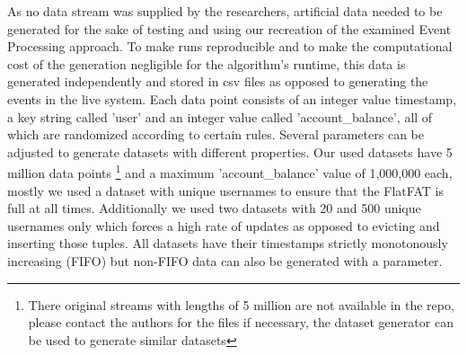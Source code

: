As no data stream was supplied by the researchers, artificial data needed to be generated
for the sake of testing and using our recreation of the examined Event Processing approach.
To make runs reproducible and to make the computational cost of the generation negligible
for the algorithm's runtime, this data is generated independently and stored in csv files
as opposed to generating the events in the live system.
Each data point consists of an integer value timestamp, a key string called 'user' and
an integer value called 'account\_balance', all of which are randomized according to certain rules.
Several parameters can be adjusted to generate datasets with different properties.
Our used datasets have 5 million data points
\footnote{\noindent There original streams with lengths of 5 million are not available
in the repo, please contact the authors for the files if necessary, the dataset
generator can be used to generate similar datasets}
and a maximum 'account\_balance' value of 1,000,000 each,
mostly we used a dataset with unique usernames to ensure that the FlatFAT is full at all times.
Additionally we used two datasets with 20 and 500 unique usernames only
which forces a high rate of updates as opposed to evicting and inserting those tuples.
All datasets have their timestamps strictly monotonously increasing (FIFO)
but non-FIFO data can also be generated with a parameter.
